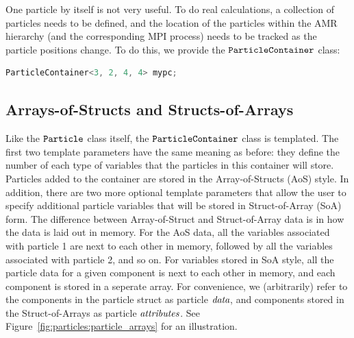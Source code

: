 One particle by itself is not very useful. To do real calculations, a collection of particles needs to be defined, and the location of the particles within the AMR hierarchy
(and the corresponding MPI process) needs to be tracked as the particle positions change. To do this, we provide the $\tt{ParticleContainer}$ class:

\begin{lstlisting}[language=cpp]
  ParticleContainer<3, 2, 4, 4> mypc;
\end{lstlisting}
   
\subsection{Arrays-of-Structs and Structs-of-Arrays}

Like the $\tt{Particle}$ class itself, the $\tt{ParticleContainer}$ class is templated. The first two template parameters have the same meaning as before: they define the number of each type of variables that the particles in this container will store. Particles added to the container are stored in the Array-of-Structs (AoS) style. In addition, there are two more optional template parameters that allow the user to specify additional particle variables that will be stored in Struct-of-Array (SoA) form. The difference between Array-of-Struct and Struct-of-Array data is in how the data is laid out in memory. For the AoS data, all the variables associated with particle 1 are next to each other in memory, followed by all the variables associated with particle 2, and so on. For variables stored in SoA style, all the particle data for a given component is next to each other in memory, and each component is stored in a seperate
array. For convenience, we (arbitrarily) refer to the components in the particle struct as particle $\emph{data}$, and components stored in the Struct-of-Arrays as particle
$\emph{attributes}$. See Figure~\ref{fig:particles:particle_arrays} for an illustration.


